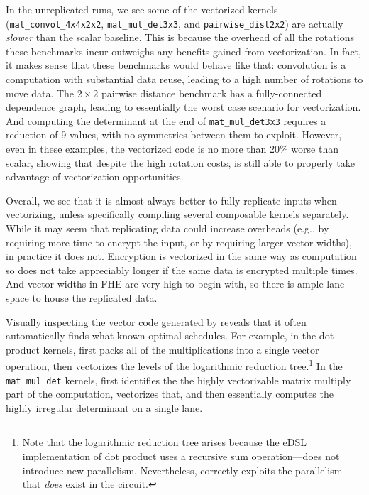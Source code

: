 In the unreplicated runs, we see some of the vectorized kernels (\texttt{mat\-\_convol\-\_4x4x2x2}, \texttt{mat\-\_mul\-\_det3x3}, and \texttt{pair\-wise\-\_dist2x2}) are actually {\em slower} than the scalar baseline.
This is because the overhead of all the rotations these benchmarks incur outweighs any benefits gained from vectorization.
In fact, it makes sense that these benchmarks would behave like that: convolution is a computation with substantial data reuse, leading to a high number of rotations to move data.
The $2 \times 2$ pairwise distance benchmark has a fully-connected dependence graph, leading to essentially the worst case scenario for vectorization.
And computing the determinant at the end of \texttt{mat\_mul\_det3x3} requires a reduction of 9 values, with no symmetries between them to exploit.
However, even in these examples, the vectorized code is no more than 20\% worse than scalar, showing that despite the high rotation costs, \system is still able to properly take advantage of vectorization opportunities.

Overall, we see that it is almost always better to fully replicate inputs when vectorizing, unless specifically compiling several composable kernels separately. While it may seem that replicating data could increase overheads (e.g., by requiring more time to encrypt the input, or by requiring larger vector widths), in practice it does not. Encryption is vectorized in the same way as computation so does not take appreciably longer if the same data is encrypted multiple times. And vector widths in FHE are very high to begin with, so there is ample lane space to house the replicated data.

Visually inspecting the vector code generated by \system reveals that it often automatically finds what known optimal schedules.
For example, in the dot product kernels, \system first packs all of the multiplications into a single vector operation, then vectorizes the levels of the logarithmic reduction tree.\footnote{Note that the logarithmic reduction tree arises because the eDSL implementation of dot product uses a recursive sum operation---\system does not introduce new parallelism. Nevertheless, \system correctly exploits the parallelism that {\em does} exist in the circuit.}
In the \texttt{mat\_mul\_det} kernels, \system first identifies the the highly vectorizable matrix multiply part of the computation, vectorizes that, and then essentially computes the highly irregular determinant on a single lane.

